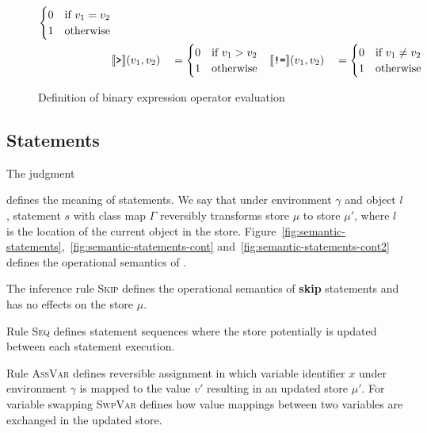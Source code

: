 \begin{figure}[ht]
\begin{align*}
\begin{cases}
            0 & \text{if}\ v_1 = v_2\\
            1 & \text{otherwise}
        \end{cases}\\
        &\llbracket\texttt{\textbf{>}}\rrbracket (v_1, v_2) &&= \begin{cases}
            0 & \text{if}\ v_1 > v_2\\ 
            1 & \text{otherwise}
        \end{cases}
        &\llbracket\texttt{\textbf{!=}}\rrbracket (v_1, v_2) &&&= \begin{cases}
            0 & \text{if}\ v_1 \not= v_2\\
            1 & \text{otherwise}
        \end{cases}
    \end{align*} 
    \caption{Definition of binary expression operator evaluation}
    \label{fig:binary-operator-evaluation}
\end{figure}


\subsection{Statements}
\label{subsec:semantics-statements}
The judgment
\begin{prooftree}
\end{prooftree}
defines the meaning of statements. We say that under environment $\gamma$ and object $l$, statement $s$ with class map $\Gamma$ reversibly transforms store $\mu$ to store $\mu'$, where $l$ is the location of the current object in the store. Figure~\ref{fig:semantic-statements},~\ref{fig:semantic-statements-cont} and~\ref{fig:semantic-statements-cont2} defines the operational semantics of \rooplpp.

The inference rule \textsc{Skip} defines the operational semantics of \textbf{skip} statements and has no effects on the store $\mu$.

Rule \textsc{Seq} defines statement sequences where the store potentially is updated between each statement execution. 

Rule \textsc{AssVar} defines reversible assignment in which variable identifier $x$ under environment $\gamma$ is mapped to the value $v'$ resulting in an updated store $\mu'$. For variable swapping \textsc{SwpVar} defines how value mappings between two variables are exchanged in the updated store.


